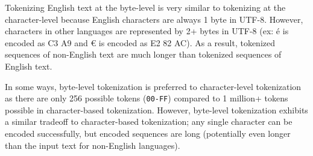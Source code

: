 Tokenizing English text at the byte-level is very similar to tokenizing at the character-level because English characters are always 1 byte in UTF-8. However, characters in other languages are represented by 2+ bytes in UTF-8 (ex: é is encoded as C3 A9 and € is encoded as E2 82 AC). As a result, tokenized sequences of non-English text are much longer than tokenized sequences of English text. 

In some ways, byte-level tokenization is preferred to character-level tokenization as there are only 256 possible tokens (\texttt{00-FF}) compared to 1 million+ tokens possible in character-based tokenization. However, byte-level tokenization exhibits a similar tradeoff to character-based tokenization; any single character can be encoded successfully, but encoded sequences are long (potentially even longer than the input text for non-English languages).

